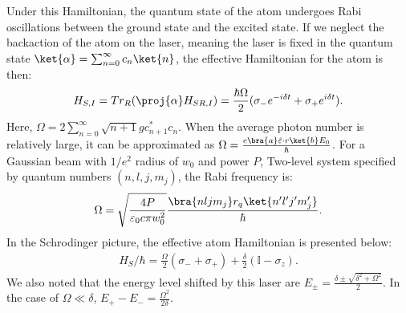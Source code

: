 \documentclass[11pt]{article}
\begin{document}
 Under this Hamiltonian, the quantum state of the atom undergoes Rabi oscillations between the ground state and the excited state. If we neglect the backaction of the atom on the laser, meaning the laser is fixed in the quantum state $\ket{\alpha} = \sum_{n = 0}^{\infty} c_n \ket{n}$, the effective Hamiltonian for the atom is then:
 \begin{align}\label{eq:Intraction-single-H_S}
     H_{S,I} = Tr_R (\proj{\alpha} H_{SR,I}) = \frac{\hbar \Omega}{2} (\sigma_- e^{-i\delta t} + \sigma_+ e^{i\delta t}).
 \end{align}
 Here, $\Omega = 2\sum_{n = 0}^\infty \sqrt{n + 1} g c_{n+1}^* c_n$. When the average photon number is relatively large, it can be approximated as $\Omega = \frac{e\bra{a}\hat{\varepsilon} \cdot r \ket{b} E_0}{\hbar}$. 
 For a Gaussian beam with $1/e^2$ radius of $w_0$ and power $P$, Two-level system specified by quantum numbers $(n,l,j,m_j)$,  the Rabi frequency is:
 \begin{align}
     \Omega = \sqrt{\frac{4P}{\varepsilon_0 c \pi w_0^2}} \frac{\bra{nljm_j} r_q \ket{n'l'j'm_j'}}{\hbar}.
 \end{align}
 In the Schrodinger picture, the effective atom Hamiltonian is presented below:
 \begin{align}\label{eq:Schrod-single-H_S}
     H_{S}/\hbar = \frac{\Omega}{2} (\sigma_- + \sigma_+ ) + \frac{\delta}{2} ( \mathbb{I} - \sigma_z).
 \end{align}
 We also noted that the energy level shifted by this laser are $E_{\pm} = \frac{\delta \pm \sqrt{\delta^2 + \Omega^2}}{2}$. 
 In the case of $\Omega \ll \delta$, $E_{+} - E_{-} = \frac{\Omega^2}{2 \delta}$.
\end{document}
